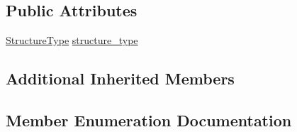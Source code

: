 \subsection*{Public Attributes}
\begin{DoxyCompactItemize}
\item 
\hyperlink{classmas_1_1_structure_a727ec3dc2ba5133a94b368ff3fb9f391}{Structure\+Type} \hyperlink{classmas_1_1_structure_af4c08e01fdddc4c24c10be7b6798b16b}{structure\+\_\+type}
\end{DoxyCompactItemize}
\subsection*{Additional Inherited Members}


\subsection{Member Enumeration Documentation}
\hypertarget{classmas_1_1_structure_a727ec3dc2ba5133a94b368ff3fb9f391}{}
